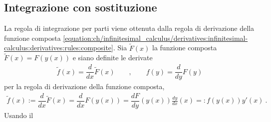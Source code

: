\documentclass[letterpaper,10pt,italian]{jupyterBook}
\begin{document}
\subsection{Integrazione con sostituzione}
\label{\detokenize{ch/infinitesimal_calculus/integrals:integrazione-con-sostituzione}}\label{\detokenize{ch/infinitesimal_calculus/integrals:infinitesimal-calculus-integrals-substitution}}
\sphinxAtStartPar
La regola di integrazione per parti viene ottenuta dalla regola di derivazione della funzione composta \eqref{equation:ch/infinitesimal_calculus/derivatives:infinitesimal-calculus:derivatives:rules:composite}. Sia \(\widetilde{F}(x)\) la funzione composta \(\widetilde{F}(x) = F( y(x) )\) e siano definite le derivate
\begin{equation*}
\begin{split}\widetilde{f}(x) = \dfrac{d}{dx} \widetilde{F}(x)  \qquad , \qquad
             f (y) = \dfrac{d}{dy}            F (y)\end{split}
\end{equation*}
\sphinxAtStartPar
per la regola di derivazione della funzione composta,
\begin{equation*}
\begin{split}\widetilde{f}(x) := \dfrac{d}{dx} \widetilde{F}(x) = \dfrac{d}{dx} F(y(x)) = 
\dfrac{d F}{d y}(y(x)) \frac{d y}{d x}(x) =: f(y(x)) y'(x) \ .\end{split}
\end{equation*}
\sphinxAtStartPar
Usando il {\hyperref[\detokenize{ch/infinitesimal_calculus/integrals:infinitesimal-calculus-integrals-thm-fund}]{}}

\sphinxAtStartPar
{}
\end{document}
